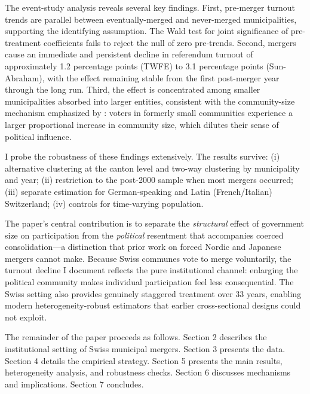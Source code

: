 \documentclass[12pt]{article}
\begin{document}
The event-study analysis reveals several key findings. First, pre-merger turnout trends are parallel between eventually-merged and never-merged municipalities, supporting the identifying assumption. The Wald test for joint significance of pre-treatment coefficients fails to reject the null of zero pre-trends. Second, mergers cause an immediate and persistent decline in referendum turnout of approximately 1.2 percentage points (TWFE) to 3.1 percentage points (Sun-Abraham), with the effect remaining stable from the first post-merger year through the long run. Third, the effect is concentrated among smaller municipalities absorbed into larger entities, consistent with the community-size mechanism emphasized by \citet{dahltufte1973}: voters in formerly small communities experience a larger proportional increase in community size, which dilutes their sense of political influence.

I probe the robustness of these findings extensively. The results survive: (i) alternative clustering at the canton level and two-way clustering by municipality and year; (ii) restriction to the post-2000 sample when most mergers occurred; (iii) separate estimation for German-speaking and Latin (French/Italian) Switzerland; (iv) controls for time-varying population.

The paper's central contribution is to separate the \textit{structural} effect of government size on participation from the \textit{political} resentment that accompanies coerced consolidation---a distinction that prior work on forced Nordic \citep{lassen2011jurisdictional, blesse2016local} and Japanese \citep{horiuchi2015municipal} mergers cannot make. Because Swiss communes vote to merge voluntarily, the turnout decline I document reflects the pure institutional channel: enlarging the political community makes individual participation feel less consequential. The Swiss setting also provides genuinely staggered treatment over 33 years, enabling modern heterogeneity-robust estimators \citep{callaway2021difference, sunandabraham2021} that earlier cross-sectional designs \citep{geys2006explaining, cancela2016explaining} could not exploit.

The remainder of the paper proceeds as follows. Section 2 describes the institutional setting of Swiss municipal mergers. Section 3 presents the data. Section 4 details the empirical strategy. Section 5 presents the main results, heterogeneity analysis, and robustness checks. Section 6 discusses mechanisms and implications. Section 7 concludes.
\end{document}
